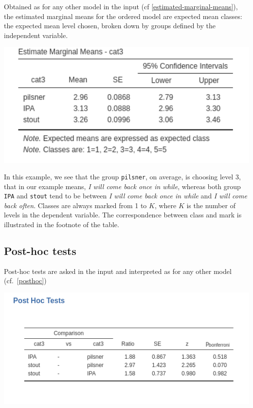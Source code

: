 \documentclass[
]{book}
\begin{document}
Obtained as for any other model in the input (cf \ref{estimated-marginal-means}), the estimated marginal means for the ordered model are expected mean classes: the expected mean level chosen, broken down by groups defined by the independent variable.

\includegraphics[width=5.47in]{bookletpics/3_ordinal_output5}

In this example, we see that the group \texttt{pilsner}, on average, is choosing level 3, that in our example means, \emph{I will come back once in while}, whereas both group \texttt{IPA} and \texttt{stout} tend to be between \emph{I will come back once in while} and \emph{I will come back often}. Classes are always marked from 1 to \(K\), where \(K\) is the number of levels in the dependent variable. The correspondence between class and mark is illustrated in the footnote of the table.

\hypertarget{post-hoc-tests-2}{%
\subsection{Post-hoc tests}\label{post-hoc-tests-2}}

Post-hoc tests are asked in the input and interpreted as for any other model (cf.~\ref{posthoc})

\includegraphics[width=7.36in]{bookletpics/3_ordinal_output6}
\end{document}
